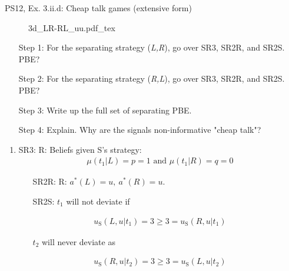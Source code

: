 \begin{frame}{PS12, Ex. 3.ii.d: Cheap talk games (extensive form)}
    \begin{multicols}{2}
      \begin{figure}[!h]
        \center{}
        {3d_LR-RL_uu.pdf_tex}
      \end{figure}\vspace{-6pt}
      \begin{itemize}
        \item[Step 1:] For the separating strategy (\textit{L,R}), go over SR3, SR2R, and SR2S. PBE?
        \item[Step 2:] For the separating strategy (\textit{R,L}), go over SR3, SR2R, and SR2S. PBE?
        \item[Step 3:] Write up the full set of separating PBE.
        \item[Step 4:] Explain. Why are the signals non-informative "cheap talk"?
      \end{itemize}
      \vfill\null\columnbreak
      \begin{enumerate}
        \item SR3: R: Beliefs given S's strategy:\vspace{-8pt}
        \begin{align*}
          \mu(t_1|L)=p=1\text{ and }\mu(t_1|R)=q=0
        \end{align*}\vspace{-18pt}
        \begin{itemize}\normalsize
          \item[SR2R:] R: $a^*(L)=u,\ a^*(R)=u$.
          \item[SR2S:] $t_1$ will not deviate if
        \end{itemize}\vspace{-10pt}
        \begin{align*}
          u_\text{S}(L,u|t_1)=3\geq 3=u_\text{S}(R,u|t_1)
        \end{align*}\vspace{-18pt}
        \begin{itemize}\normalsize
          \item[] $t_2$ will never deviate as
        \end{itemize}\vspace{-10pt}
        \begin{align*}
          u_\text{S}(R,u|t_2)=3\geq3=u_\text{S}(L,u|t_2)
        \end{align*}\vspace{-18pt}

\end{enumerate}
\end{multicols}
\end{frame}
